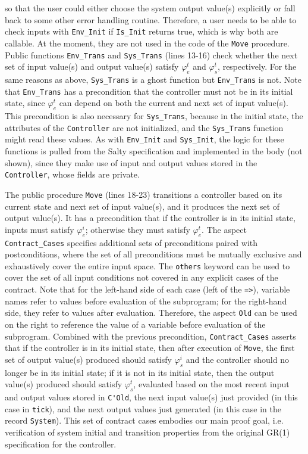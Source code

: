 \documentclass[runningheads]{llncs}
\begin{document}
so that the user could either choose the system output value(s) explicitly or fall back to some other error handling routine. 
Therefore, a user needs to be able to check inputs with \lstinline{Env_Init} if \lstinline{Is_Init} returns true, 
which is why both are callable. At the moment, they are not used in the code of the \lstinline{Move} procedure.
Public functions \lstinline{Env_Trans} and \lstinline{Sys_Trans} (lines 13-16) check whether the next set of input value(s) and output value(s) 
satisfy $\varphi_e^t$ and $\varphi_s^t$, respectively. 
For the same reasons as above, \lstinline{Sys_Trans} is a ghost function but \lstinline{Env_Trans} is not.
Note that \lstinline{Env_Trans} has a precondition that the controller must not be in its initial state, 
since $\varphi_e^t$ can depend on both the current and next set of input value(s). 
This precondition is also necessary for \lstinline{Sys_Trans}, because in the initial state, the attributes of the \lstinline{Controller} are not initialized, and the \lstinline{Sys_Trans} function might read these values. 
As with \lstinline{Env_Init} and \lstinline{Sys_Init}, the logic for these functions is pulled from the Salty specification and 
implemented in the body (not shown), since they make use of input and output values stored in the \lstinline{Controller}, whose fields are private.

The public procedure \lstinline{Move} (lines 18-23) transitions a controller based on its current state and 
next set of input value(s), and it produces the next set of output value(s). 
It has a precondition that if the controller is in its initial state, 
inputs must satisfy $\varphi_e^i$; otherwise they must satisfy $\varphi_e^t$.
The aspect \lstinline{Contract_Cases} specifies additional sets of preconditions paired with postconditions, 
where the set of all preconditions must be mutually exclusive and exhaustively cover the entire input space.
The \lstinline{others} keyword can be used to cover the set of all input conditions not covered in any explicit cases of the contract. 
Note that for the left-hand side of each case (left of the \lstinline{=>}), variable names refer to values before evaluation of the subprogram; 
for the right-hand side, they refer to values after evaluation.
Therefore, the aspect \lstinline{Old} can be used on the right to reference the value of a variable before evaluation of the subprogram. 
Combined with the previous precondition, \lstinline{Contract_Cases} asserts that if the controller is in its initial state, then after execution of \lstinline{Move}, 
the first set of output value(s) produced should satisfy $\varphi_s^i$ and the controller should no longer be in its initial state; 
if it is not in its initial state, then the output value(s) produced should satisfy $\varphi_s^t$, 
evaluated based on the most recent input and output values stored in \lstinline{C'Old}, the next input value(s) just provided (in this case in \lstinline{tick}), 
and the next output values just generated (in this case in the record \lstinline{System}). 
This set of contract cases embodies our main proof goal, i.e. verification of system initial and transition properties from the original GR(1) specification for the controller. 
\end{document}
